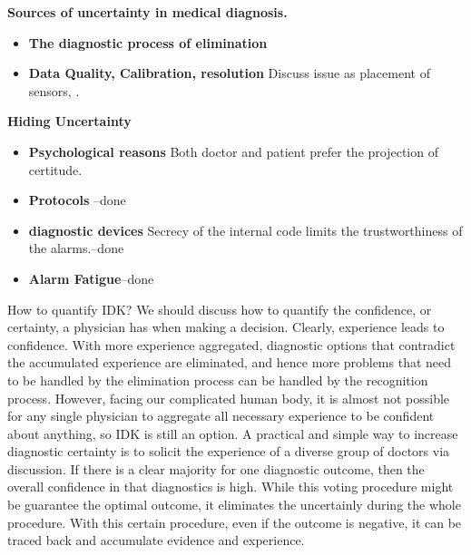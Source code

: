 \documentclass[11pt]{article}
\begin{document}
{\bf Sources of uncertainty in medical diagnosis.}
\begin{itemize}
  \item{\bf The diagnostic process of elimination}
  \item{\bf Data Quality, Calibration, resolution} Discuss issue as placement of sensors, .
  \end{itemize}

 {\bf Hiding Uncertainty}
  \begin{itemize}
    \item {\bf Psychological reasons} Both doctor and patient prefer
      the projection of certitude.
    \item {\bf Protocols} --done
    \item {\bf diagnostic devices} Secrecy of the internal code limits
      the trustworthiness of the alarms.--done
    \item{\bf Alarm Fatigue}--done
  \end{itemize}

  How to quantify IDK? We should discuss how to quantify the
  confidence, or certainty, a physician has when making a
  decision. Clearly, experience leads to confidence. With more
  experience aggregated, diagnostic options that contradict the
  accumulated experience are eliminated, and hence more problems that
  need to be handled by the elimination process can be handled by the
  recognition process. However, facing our complicated human body, it
  is almost not possible for any single physician to aggregate all
  necessary experience to be confident about anything, so IDK is still
  an option. A practical and simple way to increase diagnostic
  certainty is to solicit the experience of a diverse group of doctors
  via discussion. If there is a clear majority for one diagnostic
  outcome, then the overall confidence in that diagnostics is
  high. While this voting procedure might be guarantee the optimal
  outcome, it eliminates the uncertainly during the whole
  procedure. With this certain procedure, even if the outcome is
  negative, it can be traced back and accumulate evidence and
  experience.
%

\end{document}
